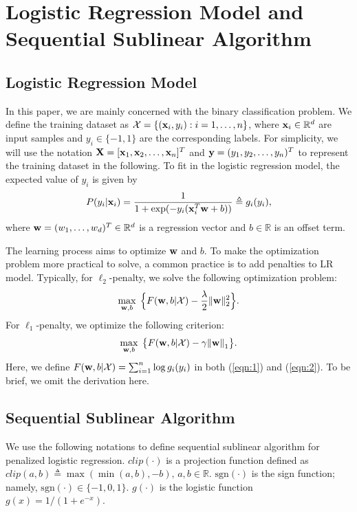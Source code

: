 \documentclass[10pt, conference, compsocconf]{IEEEtran}
\newcommand{\bw}{\mathbf{w}}
\newcommand{\lc}{\left(}
\newcommand{\rc}{\right)}
\def\X{{\bf X}}
\def\x{{\bf x}}
\def\y{{\bf y}}
\def\w{{\bf w}}
\def\XM{{\mathcal X}}
\def\RB{{\mathbb R}}
\def\sgn{\mathrm{sgn}}
\begin{document}
\section{Logistic Regression Model and Sequential Sublinear Algorithm} \label{sec:plr}

\subsection{Logistic Regression Model} \label{sec:def}
In this paper, we are mainly concerned with the binary classification problem.  	
We define the training dataset as $\XM=\{(\x_i, y_i): i=1, \ldots, n\}$, where $\x_i \in \RB^d$ are input samples and $y_i \in \{-1, 1\}$ are the corresponding labels.
For simplicity, we will use the notation $\X=[{\x}_{1}, {\x}_{2}, \ldots, {\x}_n]^{T}$ and $\y=(y_1, y_2, \ldots, y_n)^T$ to represent the training dataset in the following.
To fit in the logistic regression model, the expected value of $y_i$ is given by\vspace{-0.2cm}
\[
P(y_i|\x_i)= \frac{1}{1+ \exp(- y_i(\x_i^T \w + b))} \triangleq g_i(y_i),\vspace{-0.2cm}
\]
where $\w=(w_1, \ldots, w_d)^T \in \RB^d$ is a regression vector and $b\in \RB$ is an offset term.

The learning process aims to optimize $\w$ and $b$.
To make the optimization problem more practical to solve, a common practice is to add penalties to LR model.
Typically, for $\ell_2$-penalty, we solve the following optimization problem:\vspace{-0.2cm}
\begin{equation} \label{eqn:1}
	\max_{\bw ,b} \; \Big\{F(\w, b| \XM) - \frac{\lambda}{2}  \|\bw\|_2^{2} \Big\}.\vspace{-0.2cm}
\end{equation}
For $\ell_1$-penalty, we optimize the following criterion: \vspace{-0.2cm}
\begin{equation} \label{eqn:2}
	\max_{\bw ,b} \;  \big\{F(\w, b|\XM)- \gamma{\|\bw \|}_{1}\big\}.\vspace{-0.2cm}	
\end{equation}
Here, we define $F(\w, b| \XM) = \sum_{i=1}^n \log g_i(y_i)$ in both (\ref{eqn:1}) and (\ref{eqn:2}). To be brief, we omit the derivation here.

\subsection{Sequential Sublinear Algorithm}
We use the following notations to define sequential sublinear algorithm for penalized logistic regression. $clip\lc \cdot \rc$ is a projection function defined as $
clip\lc a,b \rc \triangleq \max \lc \min \lc a,b \rc ,-b\rc,\,a,b\in \mathbb{R}$. $\sgn \lc \cdot \rc$ is the sign function; namely, $\sgn \lc \cdot \rc \in \{-1,0,1\}$.
$g\lc \cdot \rc$ is the logistic function $g \lc x \rc=1/(1+e^{-x})$.
\end{document}
